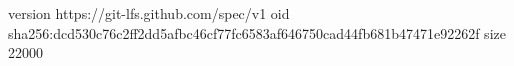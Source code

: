 version https://git-lfs.github.com/spec/v1
oid sha256:dcd530c76c2ff2dd5afbc46cf77fc6583af646750cad44fb681b47471e92262f
size 22000

